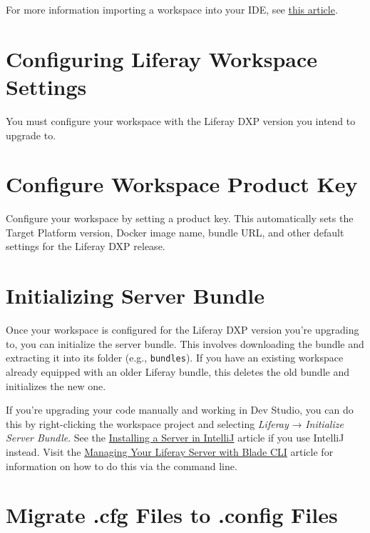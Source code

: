 For more information importing a workspace into your IDE, see
\href{/docs/7-2/reference/-/knowledge_base/r/importing-projects-in-dev-studio}{this
article}.

\section{Configuring Liferay Workspace
Settings}\label{configuring-liferay-workspace-settings}

You must configure your workspace with the Liferay DXP version you
intend to upgrade to.

\section{Configure Workspace Product
Key}\label{configure-workspace-product-key}

Configure your workspace by setting a product key. This automatically
sets the Target Platform version, Docker image name, bundle URL, and
other default settings for the Liferay DXP release.

\section{Initializing Server Bundle}\label{initializing-server-bundle}

Once your workspace is configured for the Liferay DXP version you're
upgrading to, you can initialize the server bundle. This involves
downloading the bundle and extracting it into its folder (e.g.,
\texttt{bundles}). If you have an existing workspace already equipped
with an older Liferay bundle, this deletes the old bundle and
initializes the new one.

If you're upgrading your code manually and working in Dev Studio, you
can do this by right-clicking the workspace project and selecting
\emph{Liferay} → \emph{Initialize Server Bundle}. See the
\href{/docs/7-2/reference/-/knowledge_base/r/installing-a-server-in-intellij}{Installing
a Server in IntelliJ} article if you use IntelliJ instead. Visit the
\href{/docs/7-2/reference/-/knowledge_base/r/managing-your-liferay-server-with-blade-cli}{Managing
Your Liferay Server with Blade CLI} article for information on how to do
this via the command line.

\section{Migrate .cfg Files to .config
Files}\label{migrate-.cfg-files-to-.config-files}

